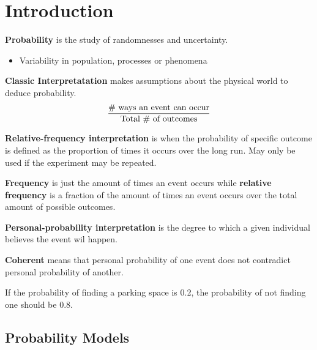 \documentclass[english, 12pt]{article}
\begin{document}
\notesheader
\section{Introduction}

\begin{defn}
\textbf{Probability} is the study of randomnesses and uncertainty.
\begin{itemize}
\item Variability in population, processes or phenomena
\end{itemize}
\end{defn}

\begin{defn}
\textbf{Classic Interpretatation} makes assumptions about the physical world to deduce probability.
\[ \frac{\text{\# ways an event can occur}}{\text{Total \# of outcomes}}\]
\end{defn}

\begin{defn}
\textbf{Relative-frequency interpretation} is when the probability of specific outcome is defined as the proportion of times it occurs over the long run. May only be used if the experiment may be repeated.
\end{defn}

\begin{defn}
\textbf{Frequency} is just the amount of times an event occurs while \textbf{relative frequency} is a fraction of the amount of times an event occurs over the total amount of possible outcomes.
\end{defn}

\begin{defn}
\textbf{Personal-probability interpretation} is the degree to which a given individual believes the event wil happen.
\end{defn}

\begin{qte}
\textbf{Coherent} means that personal probability of one event does not contradict personal probability of another.
\end{qte}

\begin{exmp}
If the probability of finding a parking space is 0.2, the probability of not finding one should be 0.8.
\end{exmp}

\subsection{Probability Models}
\end{document}

